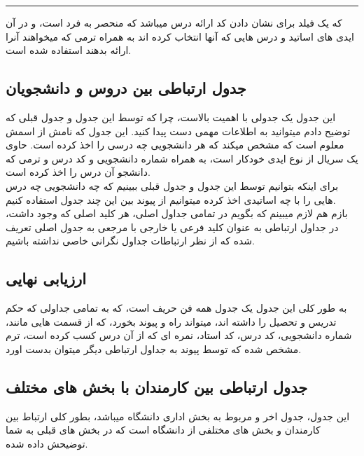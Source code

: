 \documentclass{article}
\begin{document}
\par\noindent\rule{\textwidth}{3pt}

که یک فیلد برای نشان دادن کد ارائه درس میباشد که منحصر به فرد است، و در آن ایدی های اساتید و درس هایی که آنها انتخاب کرده اند به همراه ترمی که میخواهند آنرا ارائه بدهند
استفاده شده است.

\subsection{جدول ارتباطی بین دروس و دانشجویان}
این جدول یک جدولی با اهمیت بالاست، چرا که توسط این جدول و جدول قبلی که توضیح دادم میتوانید به اطلاعات مهمی دست پیدا کنید.
این جدول که نامش
از اسمش معلوم است که مشخص میکند که هر دانشجویی چه درسی را اخذ کرده است.
حاوی یک سریال از نوع ایدی خودکار است، به همراه شماره دانشجویی و کد درس و ترمی که 
دانشجو آن درس را اخذ کرده است.\\

برای اینکه بتوانیم توسط این جدول و جدول قبلی ببینیم که چه دانشجویی چه درس هایی را با چه اساتیدی اخذ کرده میتوانیم از پیوند بین این چند جدول استفاده کنیم.\\

بازم هم لازم میبینم که بگویم در تمامی جداول اصلی، هر کلید اصلی که وجود  داشت، در جداول ارتباطی به عنوان کلید فرعی یا خارجی با مرجعی به جدول اصلی تعریف شده که از نظر
ارتباطات جداول نگرانی خاصی نداشته باشیم.

\subsection{ارزیابی نهایی}
به طور کلی این جدول یک جدول همه فن حریف است، که به تمامی جداولی که حکم تدریس و تحصیل را داشته اند،
میتواند راه و پیوند بخورد، که از قسمت هایی مانند، 
شماره دانشجویی، 
کد درس، 
کد استاد،
نمره ای که از آن درس کسب کرده است، 
ترم مشخص شده که توسط پیوند به جداول ارتباطی دیگر میتوان بدست اورد.


\subsection{جدول ارتباطی بین کارمندان با بخش های مختلف}
این جدول، جدول اخر و مربوط به بخش اداری دانشگاه میباشد، 
بطور کلی ارتباط بین کارمندان و بخش های مختلفی از دانشگاه است که در بخش های قبلی
به شما توضیحش داده شده.\\
\end{document}
